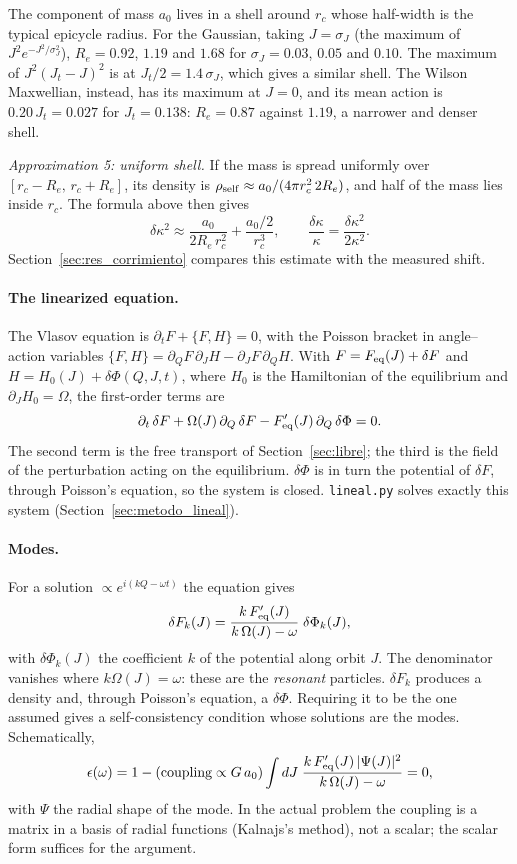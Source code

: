 \documentclass[11pt,a4paper]{article}
\begin{document}
The component of mass $a_0$ lives in a shell around $r_c$ whose half-width is the typical
epicycle radius. For the Gaussian, taking $J=\sigma_J$ (the maximum of
$J^2e^{-J^2/\sigma_J^2}$), $R_e=0.92$, $1.19$ and $1.68$ for $\sigma_J=0.03$, $0.05$ and $0.10$. The
maximum of $J^2(J_t-J)^2$ is at $J_t/2=1.4\,\sigma_J$, which gives a similar shell. The Wilson
Maxwellian, instead, has its maximum at $J=0$, and its mean action is $0.20\,J_t=0.027$ for
$J_t=0.138$: $R_e=0.87$ against $1.19$, a narrower and denser shell.

\emph{Approximation 5: uniform shell.} If the mass is spread uniformly over
$[r_c-R_e,\,r_c+R_e]$, its density is $\rho_{\rm self}\approx a_0/(4\pi r_c^2\,2R_e)$, and half of the mass
lies inside $r_c$. The formula above then gives
\[
  \delta\kappa^2 \approx \frac{a_0}{2R_e\,r_c^2} + \frac{a_0/2}{r_c^3},
  \qquad
  \frac{\delta\kappa}{\kappa} = \frac{\delta\kappa^2}{2\kappa^2}.
\]
Section~\ref{sec:res_corrimiento} compares this estimate with the measured shift.

\paragraph{The linearized equation.}
\label{sec:respuesta}
The Vlasov equation is $\partial_tF+\{F,H\}=0$, with the Poisson bracket in angle--action
variables $\{F,H\}=\partial_QF\,\partial_JH-\partial_JF\,\partial_QH$. With $F=F_{\rm eq}(J)+\delta F$ and
$H=H_0(J)+\delta\Phi(Q,J,t)$, where $H_0$ is the Hamiltonian of the equilibrium and
$\partial_JH_0=\Omega$, the first-order terms are
\[
  \partial_t\,\delta F + \Omega(J)\,\partial_Q\,\delta F
  - F_{\rm eq}'(J)\,\partial_Q\,\delta\Phi = 0 .
\]
The second term is the free transport of Section~\ref{sec:libre}; the third is the field
of the perturbation acting on the equilibrium. $\delta\Phi$ is in turn the potential of
$\delta F$, through Poisson's equation, so the system is closed. \texttt{lineal.py} solves
exactly this system (Section~\ref{sec:metodo_lineal}).

\paragraph{Modes.} For a solution $\propto e^{i(kQ-\omega t)}$ the equation gives
\[
  \delta F_k(J) = \frac{k\,F_{\rm eq}'(J)}{k\,\Omega(J)-\omega}\;\delta\Phi_k(J),
\]
with $\delta\Phi_k(J)$ the coefficient $k$ of the potential along orbit $J$. The denominator
vanishes where $k\Omega(J)=\omega$: these are the \emph{resonant} particles. $\delta F_k$ produces a
density and, through Poisson's equation, a $\delta\Phi$. Requiring it to be the one assumed
gives a self-consistency condition whose solutions are the modes. Schematically,
\[
  \epsilon(\omega) = 1 - (\text{coupling}\propto G\,a_0)\int dJ\;
  \frac{k\,F_{\rm eq}'(J)\,|\Psi(J)|^2}{k\,\Omega(J)-\omega} = 0 ,
\]
with $\Psi$ the radial shape of the mode. In the actual problem the coupling is a matrix
in a basis of radial functions (Kalnajs's method), not a scalar; the scalar form
suffices for the argument.
\end{document}
